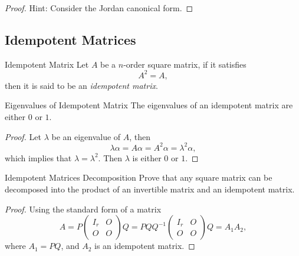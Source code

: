 \begin{proof}
  Hint: Consider the Jordan canonical form.
\end{proof}

\subsection{Idempotent Matrices}

\begin{definition}{Idempotent Matrix}{}
  Let $A$ be a $n$-order square matrix, if it satisfies
  \begin{equation}
    A^2 = A,
  \end{equation}
  then it is said to be an \emph{idempotent matrix}.
\end{definition}

\begin{proposition}{Eigenvalues of Idempotent Matrix}{}
  The eigenvalues of an idempotent matrix are either $0$ or $1$.
\end{proposition}

\begin{proof}
  Let $\lambda$ be an eigenvalue of $A$, then
  \begin{equation}
    \lambda \alpha = A \alpha = A^2\alpha = \lambda^2\alpha,
  \end{equation}
  which implies that $\lambda = \lambda^2$.
  Then $\lambda$ is either $0$ or $1$.
\end{proof}

\begin{example}{Idempotent Matrices Decomposition}{}
  Prove that any square matrix can be decomposed into the product
  of an invertible matrix and an idempotent matrix.
\end{example}

\begin{proof}
  Using the standard form of a matrix
  \begin{equation}
    A = P \left(
      \begin{array}{cc}
        I_r&O\\
        O&O
      \end{array}
    \right)Q = PQ Q^{-1} \left(
      \begin{array}{cc}
        I_r&O\\
        O&O
      \end{array}
    \right) Q = A_1A_2,
  \end{equation}
  where $A_1 = PQ$, and $A_2$ is an idempotent matrix.
\end{proof}





